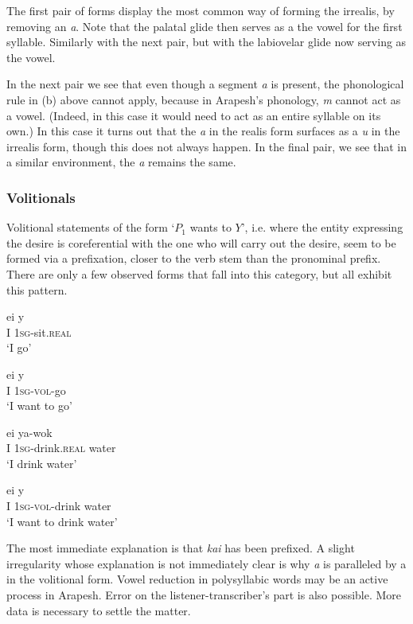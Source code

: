 \documentclass[pdftex,12pt,letterpaper]{article}
\let\ipa\textipa
\begin{document}
 \noindent The first pair of forms display the most common way of forming the irrealis, by removing an \emph{a}. Note that the palatal glide then serves as a the vowel for the first syllable. Similarly with the next pair, but with the labiovelar glide now serving as the vowel.

 In the next pair we see that even though a segment \emph{a} is present, the phonological rule in (b) above cannot apply, because in Arapesh's phonology, \emph{m} cannot act as a vowel. (Indeed, in this case it would need to act as an entire syllable on its own.) In this case it turns out that the \emph{a} in the realis form surfaces as a \emph{u} in the irrealis form, though this does not always happen. In the final pair, we see that in a similar environment, the \emph{a} remains the same.

 \subsubsection{Volitionals}

 Volitional statements of the form `$P_1$ wants to $Y$', i.e. where the entity expressing the desire is coreferential with the one who will carry out the desire, seem to be formed via a prefixation, closer to the verb stem than the pronominal prefix. There are only a few observed forms that fall into this category, but all exhibit this pattern.

 \begin{exe}
 \ex
 \gll ei y\ipa{@-nak} \\
 I \textsc{1sg}-sit.\textsc{real} \\
 \trans `I go'

 \ex
 \gll ei y\ipa{@-\textbf{kai}-nak} \\
 I \textsc{1sg}-\textsc{vol}-go \\
 \trans `I want to go'

 \ex
 \gll ei ya-wok \ipa{@ber} \\
 I \textsc{1sg}-drink.\textsc{real} water\\
 \trans `I drink water'

 \ex
 \gll ei y\ipa{@-\textbf{kai}-wok} \ipa{@ber} \\
 I \textsc{1sg}-\textsc{vol}-drink water\\
 \trans `I want to drink water'

 \end{exe}

 \noindent The most immediate explanation is that \emph{kai} has been prefixed. A slight irregularity whose explanation is not immediately clear is why \emph{a} is paralleled by a \emph{\ipa{@}} in the volitional form. Vowel reduction in polysyllabic words may be an active process in Arapesh. Error on the listener-transcriber's part is also possible. More data is necessary to settle the matter.
\end{document}
